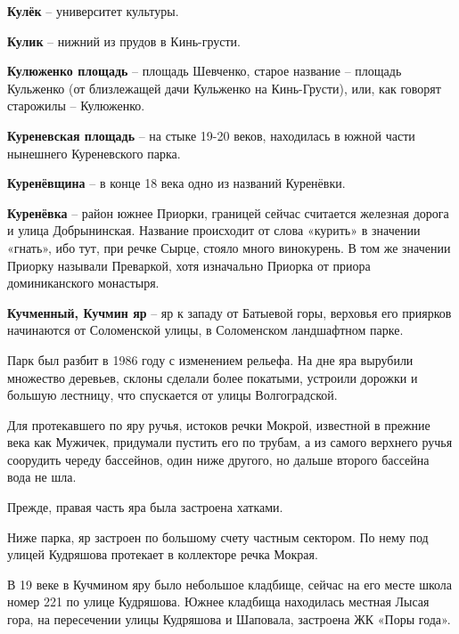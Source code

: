 \medskip

\textbf{Кулёк} – университет культуры.\\


\medskip

\textbf{Кулик} – нижний из прудов в Кинь-грусти.\\

\medskip

\textbf{Кулюженко площадь} – площадь Шевченко, старое название – площадь Кульженко (от близлежащей дачи Кульженко на Кинь-Грусти), или, как говорят старожилы – Кулюженко.\\

\medskip

\textbf{Куреневская площадь} – на стыке 19-20 веков, находилась в южной части нынешнего Куреневского парка.\\

\medskip

\textbf{Куренёвщина} – в конце 18 века одно из названий Куренёвки.\\

\medskip

\textbf{Куренёвка} – район южнее Приорки, границей сейчас считается железная дорога и улица Добрынинская. Название происходит от слова «курить» в значении «гнать», ибо тут, при речке Сырце, стояло много винокурень. В том же значении Приорку называли Преваркой, хотя изначально Приорка от приора доминиканского монастыря.\\

\medskip

\textbf{Кучменный, Кучмин яр} – яр к западу от Батыевой горы, верховья его приярков начинаются от Соломенской улицы, в Соломенском ландшафтном парке.

Парк был разбит в 1986 году с изменением рельефа. На дне яра вырубили множество деревьев, склоны сделали более покатыми, устроили дорожки и большую лестницу, что спускается от улицы Волгоградской. 

Для протекавшего по яру ручья, истоков речки Мокрой, известной в прежние века как Мужичек, придумали пустить его по трубам, а из самого верхнего ручья соорудить череду бассейнов, один ниже другого, но дальше второго бассейна вода не шла.

Прежде, правая часть яра была застроена хатками.

Ниже парка, яр застроен по большому счету частным сектором. По нему под улицей Кудряшова протекает в коллекторе речка Мокрая. 

В 19 веке в Кучмином яру было небольшое кладбище, сейчас на его месте школа номер 221 по улице Кудряшова. Южнее кладбища находилась местная Лысая гора, на пересечении улицы Кудряшова и Шаповала, застроена ЖК «Поры года».\\


